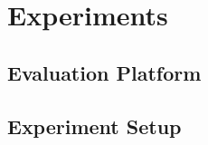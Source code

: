 \section{Experiments}
\subsection{Evaluation Platform} %

%
%

\subsection{Experiment Setup} %
%

%
